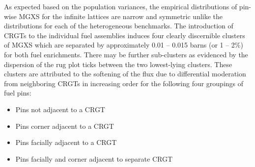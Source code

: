 As expected based on the population variances, the empirical distributions of pin-wise \ac{MGXS} for the infinite lattices are narrow and symmetric unlike the distributions for each of the heterogeneous benchmarks. The introduction of \acp{CRGT} to the individual fuel assemblies induces four clearly discernible clusters of \ac{MGXS} which are separated by approximately 0.01 -- 0.015 barns (or 1 -- 2\%) for both fuel enrichments. There may be further sub-clusters as evidenced by the dispersion of the rug plot ticks between the two lowest-lying clusters. These clusters are attributed to the softening of the flux due to differential moderation from neighboring \acp{CRGT} in increasing order for the following four groupings of fuel pins:

\begin{itemize}[noitemsep, itemsep=-0.75em]
  \item Pins not adjacent to a \ac{CRGT}
  \item Pins corner adjacent to a \ac{CRGT}
  \item Pins facially adjacent to a \ac{CRGT}
  \item Pins facially and corner adjacent to separate \ac{CRGT}
\end{itemize}

